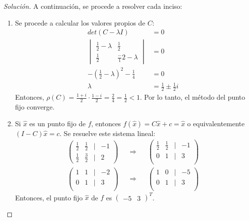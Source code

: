 \documentclass[12pt]{book}
\newenvironment{solucion}
  {\renewcommand\qedsymbol{$\square$}\begin{proof}[Solución]}
  {\end{proof}}
\begin{document}
\begin{solucion}
A continuación, se procede a resolver cada inciso:
\renewcommand{\labelenumi}{(\alph{enumi})}
\begin{enumerate}
    \item Se procede a calcular los valores propios de $C$:
    \begin{align*}
    det(C-\lambda I)&=0\\
    \begin{vmatrix}
\frac{1}{2}-\lambda  & \frac{1}{2}\\
\frac{1}{2} & \frac-{1}{2}-\lambda
\end{vmatrix} &=0\\
-\left(\frac{1}{2}-\lambda\right)^2-\frac{1}{4}&=0\\
\lambda&=\frac{1}{2}\pm\frac{1}{2}i
\end{align*}
Entonces, $\rho(C)=\frac{1+i}{2}\cdot\frac{1-i}{2}=\frac{2}{4}=\frac{1}{2}<1$. Por lo tanto, el método del punto fijo converge.
\item Si $\hat{x}$ es un punto fijo de $f$, entonces $f(\hat{x})=C\hat{x}+c=\hat{x}$ o equivalentemente $(I-C)\hat{x}=c$. Se resuelve este sistema lineal:
\begin{align*}
    \begin{pmatrix}
    \frac{1}{2} & \frac{1}{2} & | & -1\\
    \frac{1}{2} & \frac{3}{2} & | & 2
    \end{pmatrix} && \Rightarrow & & \begin{pmatrix}
    \frac{1}{2} & \frac{1}{2} & | & -1\\
    0 & 1 & | & 3\\
    \end{pmatrix}\\[8pt] \begin{pmatrix}
    1 & 1 & | & -2\\
    0 & 1 & | & 3\\
    \end{pmatrix} && \Rightarrow & &\begin{pmatrix}
    1 & 0 & | & -5\\
    0 & 1 & | & 3\\
    \end{pmatrix}
\end{align*}
Entonces, el punto fijo $\hat{x}$ de $f$ es $\begin{pmatrix}
-5&
3
\end{pmatrix}^T$.
\end{enumerate}
\end{solucion}
\end{document}
